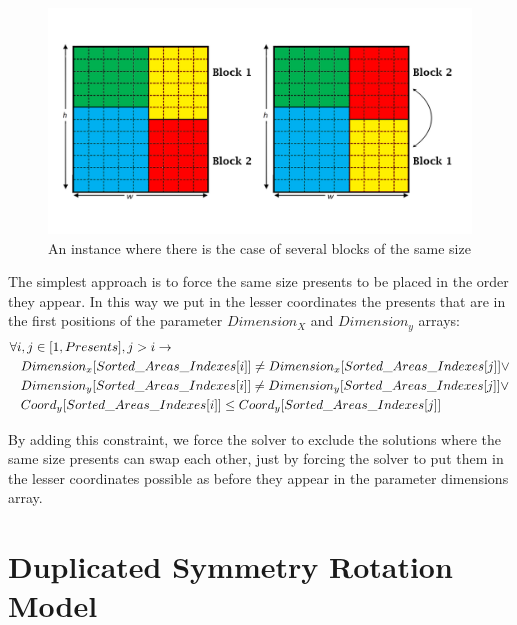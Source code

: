 \begin{figure}[ht]
	\centering
	\includegraphics[width=\textwidth]{images/duplicated_problem.png}
	\caption{An instance where there is the case of several blocks of the same size}
	\label{fig:overlaps}
\end{figure}

The simplest approach is to force the same size presents to be placed in the order they appear. In this way we put in the lesser
coordinates the presents that are in the first positions of the parameter $Dimension_X$ and $Dimension_y$ arrays:\\

\begin{equation*}\begin{split}
    &\forall i, j \in [1, Presents], j > i \rightarrow \\
    &\hspace{0.3cm} Dimension_x[Sorted\_Areas\_Indexes[i]] \neq Dimension_x[Sorted\_Areas\_Indexes[j]] \lor \\
    &\hspace{0.3cm} Dimension_y[Sorted\_Areas\_Indexes[i]] \neq Dimension_y[Sorted\_Areas\_Indexes[j]] \lor \\
    &\hspace{0.3cm} Coord_y[Sorted\_Areas\_Indexes[i]] \leq Coord_y[Sorted\_Areas\_Indexes[j]]
\end{split}\end{equation*}

By adding this constraint, we force the solver to exclude the solutions where the same size presents can swap each other,
just by forcing the solver to put them in the lesser coordinates possible as before they appear in the parameter dimensions array.



\newpage
\section{Duplicated Symmetry Rotation Model}

